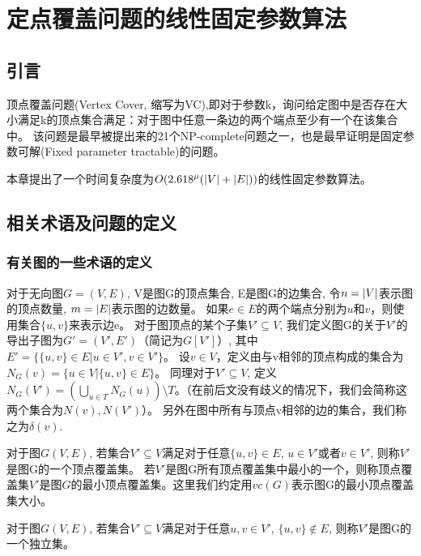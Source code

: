 \chapter{定点覆盖问题的线性固定参数算法}
\section{引言}
顶点覆盖问题(Vertex Cover, 缩写为VC),即对于参数k，询问给定图中是否存在大小满足k的顶点集合满足：对于图中任意一条边的两个端点至少有一个在该集合中。
该问题是最早被提出来的21个NP-complete问题之一\cite{karp1972reducibility}，也是最早证明是固定参数可解(Fixed parameter tractable)的问题\cite{downey2012parameterized}。

本章提出了一个时间复杂度为$O(2.618^{\mu}(\left\vert V \right\vert + \left\vert E \right\vert))$的线性固定参数算法。

\section{相关术语及问题的定义}
\subsection{有关图的一些术语的定义}
对于无向图$G=(V,E)$, V是图G的顶点集合, E是图G的边集合, 令$n = \left\vert V \right\vert$表示图的顶点数量, $m = \left\vert E \right\vert$表示图的边数量。
如果$e \in E$的两个端点分别为$u$和$v$，则使用集合$\{u, v \}$来表示边e。
对于图顶点的某个子集$V' \subseteq V$, 我们定义图G的关于$V'$的导出子图为$G' = (V', E')$（简记为$G[V']$）, 其中$E' = \{\{u, v\} \in E| u \in V', v \in V' \}$。
设$v \in V$，定义由与v相邻的顶点构成的集合为$N_{G}(v) = \{ u \in V | \{u, v\} \in E\}$。
同理对于$V' \subseteq V$, 定义$N_{G}(V') = (\bigcup_{u \in T}N_{G}(u)) \setminus T $。（在前后文没有歧义的情况下，我们会简称这两个集合为$N(v), N(V')$）。
另外在图中所有与顶点v相邻的边的集合，我们称之为$\delta(v)$.

\begin{definition}[顶点覆盖集]
对于图$G(V, E)$, 若集合$V' \subseteq V$满足对于任意$\{u, v\} \in E$, $u \in V'$或者$v \in V'$, 则称$V'$是图G的一个顶点覆盖集。
若$V'$是图G所有顶点覆盖集中最小的一个，则称顶点覆盖集$V'$是图$G$的最小顶点覆盖集。这里我们约定用$vc(G)$表示图G的最小顶点覆盖集大小。
\end{definition}

\begin{definition}[独立集]
对于图$G(V, E)$, 若集合$V' \subseteq V$满足对于任意$u, v \in V'$, $\{u, v\} \notin E$, 则称$V'$是图G的一个独立集。
\end{definition}

